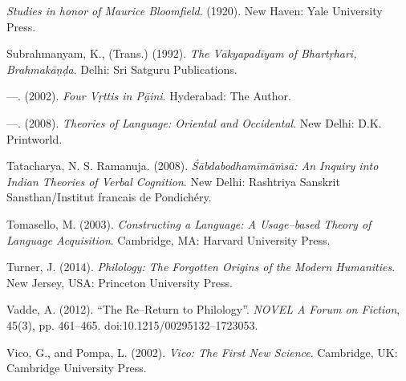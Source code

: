 \begin{thebibliography}{99}
  \textit{Studies in honor of Maurice Bloomfield}. (1920). New Haven: Yale University Press.

  Subrahmanyam, K., (Trans.) (1992). \textit{The Vākyapadīyam of Bhartṛhari, Brahmakāṇḍa}. Delhi: Sri Satguru Publications.

  —. (2002). \textit{Four \textit{Vṛttis} in Pạ̄ini}. Hyderabad: The Author.

  —. (2008). \textit{Theories of Language: Oriental and Occidental}. New Delhi: D.K. Printworld.

  Tatacharya, N. S. Ramanuja. (2008). \textit{Śābdabodhamīmāṁsā: An Inquiry into Indian Theories of Verbal Cognition}. New Delhi: Rashtriya Sanskrit Sansthan/Institut francais de Pondichéry.

  Tomasello, M. (2003). \textit{Constructing a Language: A Usage–based Theory of Language Acquisition}. Cambridge, MA: Harvard University Press.

  Turner, J. (2014). \textit{Philology: The Forgotten Origins of the Modern Humanities}. New Jersey, USA: Princeton University Press.

  Vadde, A. (2012). “The Re–Return to Philology”. \textit{NOVEL A Forum on Fiction}, 45(3), pp. 461–465. doi:10.1215/00295132–1723053.

  Vico, G., and Pompa, L. (2002). \textit{Vico: The First New Science}. Cambridge, UK: Cambridge University Press.

 \end{thebibliography}

\theendnotes

